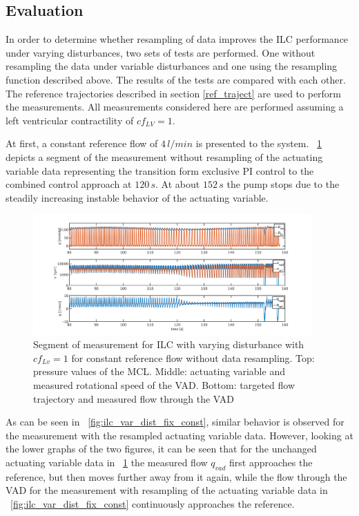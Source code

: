 \subsection{Evaluation}
In order to determine whether resampling of data improves the ILC performance under varying disturbances, two sets of tests are performed. One without resampling the data under variable disturbances and one using the resampling function described above. The results of the tests are compared with each other.
The reference trajectories described in section \ref{ref_traject} are used to perform the measurements. All measurements considered here are performed assuming a left ventricular contractility of $cf_{LV}=1$.


At first, a constant reference flow of $4\,l/min$ is presented to the system. \figurename~\ref{fig:ilc_var_dist_unfix_const} depicts a segment of the measurement without resampling of the actuating variable data representing the transition form exclusive PI control to the combined control approach at $120\,s$. At about $152\,s$ the pump stops due to the steadily increasing instable behavior of the actuating variable.
\begin{figure}[ht!]
  \centering
  \includegraphics[width=0.95\textwidth]{images/chapt_5/ILC/ilc_var_dist_unfix_const.pdf}
  \caption[Segment of measurement for ILC with varying disturbance with $cf_{Lv}=1$ for constant reference flow without data resampling]{Segment of measurement for ILC with varying disturbance with $cf_{Lv}=1$ for constant reference flow without data resampling. Top:  pressure values of the MCL. Middle: actuating variable and measured rotational speed of the VAD. Bottom: targeted flow trajectory and measured flow through the VAD}
  \label{fig:ilc_var_dist_unfix_const}
\end{figure}
As can be seen in \figurename~\ref{fig:ilc_var_dist_fix_const}, similar behavior is observed for the measurement with the resampled actuating variable data.
However, looking at the lower graphs of the two figures, it can be seen that for the unchanged actuating variable data in \figurename~\ref{fig:ilc_var_dist_unfix_const} the measured flow $q_{vad}$ first approaches the reference, but then moves further away from it again, while the flow through the VAD for the measurement with resampling of the actuating variable data in \figurename~\ref{fig:ilc_var_dist_fix_const} continuously approaches the reference.
